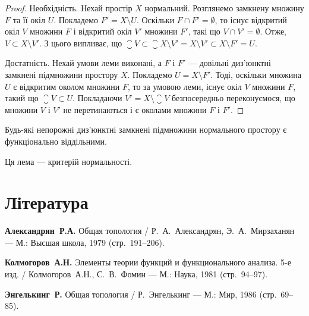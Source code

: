 \begin{proof}
Необхідність. Нехай простір $X$ нормальний.
Розглянемо замкнену множину $F$ та її окіл $U$.
Покладемо $F' = X \setminus U$. Оскільки $F \cap F' = \emptyset$, то існує
відкритий окіл $V$ множини $F$ і відкритий окіл $V'$ множини
$F'$, такі що $V \cap V' = \emptyset$. Отже, $V \subset X \setminus V'$. З цього
випливає, що $\closure{V} \subset \closure{X \setminus V'} = X \setminus V' \subset X \setminus F' = U$.

Достатність. Нехай умови леми виконані, а $F$ і $F'$ ---
довільні диз'юнктні замкнені підмножини простору $X$.
Покладемо $U = X \setminus F'$. Тоді, оскільки множина $U$ є
відкритим околом множини $F$, то за умовою леми, існує
окіл $V$ множини $F$, такий що $\closure{V} \subset U$. Покладаючи
$V' = X \setminus \closure{V}$ безпосередньо переконуємося, що множини $V$ і
$V'$ не перетинаються і є околами множини $F$ і $F'$.
\end{proof}

\begin{theorem}
Будь-які непорожні диз'юнктні
замкнені підмножини нормального простору є
функціонально віддільними.
\end{theorem}

\begin{remark}
Ця лема --- критерій нормальності.
\end{remark}

\section{Література}

\begin{enumerate}[label={[\arabic*]}]
\item \textbf{Александрян~Р.А.}
Общая топология /
Р.~А.~Александрян, Э.~А.~Мирзаханян ---
М.: Высшая школа, 1979 (стр.~191--206).
\item \textbf{Колмогоров~А.Н.}
Элементы теории функций и функционального анализа. 5-е изд. /
Колмогоров~А.Н., С.~В.~Фомин ---
М.: Наука, 1981 (стр.~94--97).
\item \textbf{Энгелькинг~Р.}
Общая топология /
Р.~Энгелькинг ---
М.: Мир, 1986 (стр.~69--85).
\end{enumerate}